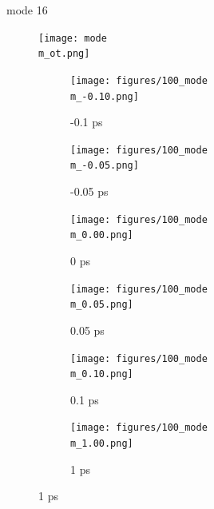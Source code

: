 \documentclass{beamer}
\newcommand\w{0.32}
\begin{document}
\renewcommand\m{16}
\begin{frame}{mode \m}
			\vspace{\vh mm}
	\begin{figure}
		\centering
		\texttt{[image: mode\\m\_ot.png]}
	\end{figure}
	\begin{figure}
		\centering
		\begin{subfigure}[b]{\w\textwidth}
			\centering
			\texttt{[image: figures/100\_mode\\m\_-0.10.png]}
			\caption{-0.1 ps}
		\end{subfigure}
		\begin{subfigure}[b]{\w\textwidth}
			\centering
			\texttt{[image: figures/100\_mode\\m\_-0.05.png]}
			\caption{-0.05 ps}
		\end{subfigure}
		\begin{subfigure}[b]{\w\textwidth}
			\centering
			\texttt{[image: figures/100\_mode\\m\_0.00.png]}
			\caption{0 ps}
		\end{subfigure}
		\begin{subfigure}[b]{\w\textwidth}
			\centering
			\texttt{[image: figures/100\_mode\\m\_0.05.png]}
			\caption{0.05 ps}
		\end{subfigure}
		\begin{subfigure}[b]{\w\textwidth}
			\centering
			\texttt{[image: figures/100\_mode\\m\_0.10.png]}
			\caption{0.1 ps}
		\end{subfigure}
		\begin{subfigure}[b]{\w\textwidth}
			\centering
			\texttt{[image: figures/100\_mode\\m\_1.00.png]}
			\caption{1 ps}
		\end{subfigure}
	\end{figure}
\end{frame}
\end{document}
